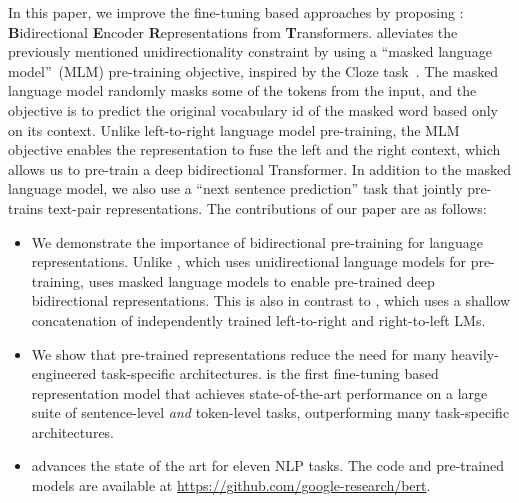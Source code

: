In this paper, we improve the fine-tuning based approaches by proposing \bert: \textbf{B}idirectional \textbf{E}ncoder \textbf{R}epresentations from \textbf{T}ransformers. \bert alleviates the previously mentioned unidirectionality constraint by using a ``masked language model''~(MLM) pre-training objective, inspired by the Cloze task~\cite{taylor:1953:_cloze}. The masked language model randomly masks some of the tokens from the input, and the objective is to predict the original vocabulary id of the masked word based only on its context. Unlike left-to-right language model pre-training, the MLM objective enables the representation to fuse the left and the right context, which allows us to pre-train a deep bidirectional Transformer. In addition to the masked language model, we also use a ``next sentence prediction'' task that jointly pre-trains text-pair representations. The contributions of our paper are as follows:
\begin{itemize}[leftmargin=1em]
  \item We demonstrate the importance of bidirectional pre-training for language representations. Unlike \citet{radford-etal:2018}, which uses unidirectional language models for pre-training, \bert uses masked language models to enable pre-trained deep bidirectional representations. This is also in contrast to \citet{peters-etal:2018:_deep}, which uses a shallow concatenation of independently trained left-to-right and right-to-left LMs.
  \item We show that pre-trained representations reduce the need for many heavily-engineered task-specific architectures. \bert is the first fine-tuning based representation model that achieves state-of-the-art performance on a large suite of sentence-level {\em and} token-level tasks, outperforming many task-specific architectures.
  \item \bert advances the state of the art for eleven NLP tasks. 
%
    The code and pre-trained models are available at \url{https://github.com/google-research/bert}.
\end{itemize}
